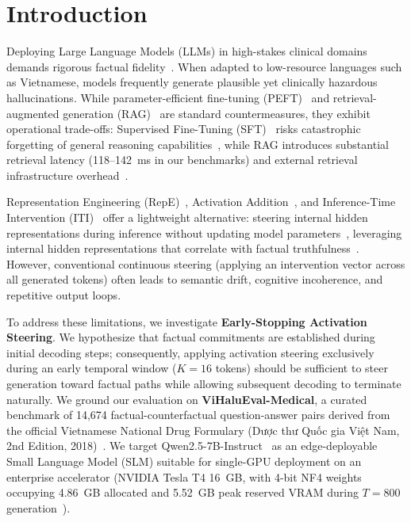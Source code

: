 \documentclass[runningheads]{llncs}
\newcommand{\vn}[1]{{\fontencoding{T5}\selectfont #1}}
\begin{document}
\section{Introduction}\label{sec:intro}
Deploying Large Language Models (LLMs) in high-stakes clinical domains demands rigorous factual fidelity~\cite{ref3,ref13}. When adapted to low-resource languages such as Vietnamese, models frequently generate plausible yet clinically hazardous hallucinations. While parameter-efficient fine-tuning (PEFT)~\cite{ref7} and retrieval-augmented generation (RAG)~\cite{ref5} are standard countermeasures, they exhibit operational trade-offs: Supervised Fine-Tuning (SFT)~\cite{ref10} risks catastrophic forgetting of general reasoning capabilities~\cite{ref12}, while RAG introduces substantial retrieval latency (118--142~ms in our benchmarks) and external retrieval infrastructure overhead~\cite{ref_faiss}.

Representation Engineering (RepE)~\cite{ref1}, Activation Addition~\cite{ref8}, and Inference-Time Intervention (ITI)~\cite{ref2,ref9} offer a lightweight alternative: steering internal hidden representations during inference without updating model parameters~\cite{ref1,ref2}, leveraging internal hidden representations that correlate with factual truthfulness~\cite{ref11}. However, conventional continuous steering (applying an intervention vector across all generated tokens) often leads to semantic drift, cognitive incoherence, and repetitive output loops.

To address these limitations, we investigate \textbf{Early-Stopping Activation Steering}. We hypothesize that factual commitments are established during initial decoding steps; consequently, applying activation steering exclusively during an early temporal window ($K=16$ tokens) should be sufficient to steer generation toward factual paths while allowing subsequent decoding to terminate naturally. We ground our evaluation on \textbf{ViHaluEval-Medical}, a curated benchmark of 14,674 factual-counterfactual question-answer pairs derived from the official Vietnamese National Drug Formulary (\vn{Dược thư Quốc gia Việt Nam}, 2nd Edition, 2018)~\cite{ref6}. We target Qwen2.5-7B-Instruct~\cite{ref4} as an edge-deployable Small Language Model (SLM) suitable for single-GPU deployment on an enterprise accelerator (NVIDIA Tesla T4 16~GB, with 4-bit NF4 weights occupying 4.86~GB allocated and 5.52~GB peak reserved VRAM during $T=800$ generation~\cite{ref_bnb}).
\end{document}
